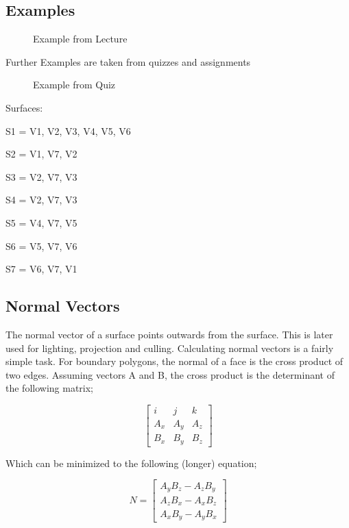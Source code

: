 \subsection{Examples}
   \begin{figure}[!htb]
	\caption{\label{fig:pyramidPolygons} Example from Lecture}
	\end{figure}
\newpage
Further Examples are taken from quizzes and assignments
   \begin{figure}[!htb]
	\caption{\label{fig:pyramidPolygons} Example from Quiz}
\end{figure}

Surfaces:

S1 = V1, V2, V3, V4, V5, V6

S2 = V1, V7, V2

S3 = V2, V7, V3

S4 = V2, V7, V3

S5 = V4, V7, V5

S6 = V5, V7, V6

S7 = V6, V7, V1
\subsection{Normal Vectors}
The normal vector of a surface points outwards from the surface. This is later used for lighting, projection and culling. Calculating normal vectors is a fairly simple task. For boundary polygons, the normal of a face is the cross product of two edges.
Assuming vectors A and B, the cross product is the determinant of the following matrix;

\begin{equation}
\label{eqn:crossprodMat}
\begin{bmatrix}
i & j & k\\ 
A_x & A_y & A_z\\ 
B_x & B_y & B_z
\end{bmatrix}
\end{equation}

Which can be minimized to the following (longer) equation;

\begin{equation}
\label{eqn:crossprodLine}
N = \begin{bmatrix}
A_yB_z - A_zB_y\\ 
A_zB_x - A_xB_z\\ 
A_xB_y - A_yB_x
\end{bmatrix}
\end{equation}


